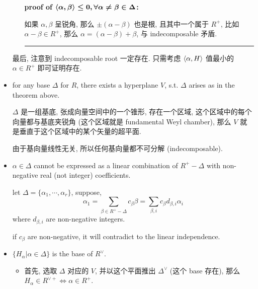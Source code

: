 \begin{itemize}
\begin{tcolorbox}[title=proof:]
\begin{itemize}
			\noindent\hdashrule[0.5ex]{\linewidth}{0.5pt}{1mm} %
			
			\textbf{proof of $\boldsymbol{\braket{\alpha, \beta} \leq 0, \forall \alpha \neq \beta \in \Delta}$:}
			
			如果 $\alpha, \beta$ 呈锐角, 那么 $\pm (\alpha - \beta)$ 也是根, 且其中一个属于 $R^+$, 比如 $\alpha - \beta \in R^+$, 那么 $\alpha = (\alpha - \beta) + \beta$, 与 indecomposable 矛盾.
			
			\noindent\rule[0.5ex]{\linewidth}{0.5pt} %
		\end{itemize}
		
		最后, 注意到 indecomposable root 一定存在. 只需考虑 $\braket{\alpha, H}$ 值最小的 $\alpha \in R^+$ 即可证明存在.
	\end{tcolorbox}
	
	\item for any base $\Delta$ for $R$, there exists a hyperplane $V$, s.t. $\Delta$ arises as in the theorem above.
	
	\begin{tcolorbox}[title=proof:]
		$\Delta$ 是一组基底, 张成向量空间中的一个锥形, 存在一个区域, 这个区域中的每个向量都与基底夹锐角 (这个区域就是 fundamental Weyl chamber), 那么 $V$ 就是垂直于这个区域中的某个矢量的超平面.
		
		由于基向量线性无关, 所以任何基向量都不可分解 (indecomposable).
	\end{tcolorbox}
	
	\item $\alpha \in \Delta$ cannot be expressed as a linear combination of $R^+ - \Delta$ with non-negative real (not integer) coefficients.
	
	\begin{tcolorbox}[title=proof:]
		let $\Delta = \{\alpha_1, \cdots, \alpha_r\}$, suppose,
		\begin{equation}
			\alpha_1 = \sum_{\beta \in R^+ - \Delta} c_\beta \beta = \sum_{\beta, i} c_\beta d_{\beta, i} \alpha_i
		\end{equation}
		where $d_{\beta, i}$ are non-negative integers.
		
		if $c_\beta$ are non-negative, it will contradict to the linear independence.
	\end{tcolorbox}
	
	\item $\{H_\alpha | \alpha \in \Delta\}$ is the base of $R^\vee$.
	
	\begin{tcolorbox}[title=proof:]
		\begin{itemize}
			\item 首先, 选取 $\Delta$ 对应的 $V$, 并以这个平面推出 $\Delta^\vee$ (这个 base 存在), 那么 $H_\alpha \in R^{\vee +} \iff \alpha \in R^+$.
			

\end{itemize}
\end{tcolorbox}
\end{itemize}

